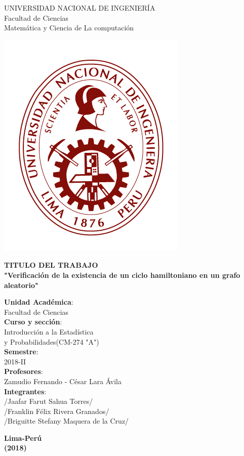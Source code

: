 \documentclass[11pt,a4paper]{article}
\begin{document}
	\begin{center}
	\LARGE \noindent UNIVERSIDAD NACIONAL DE INGENIERÍA\\
	Facultad de Ciencias\\
	Matemática y Ciencia de La computaci{\'o}n
	\end{center}

	\begin{center}
	\begin{minipage}[c]{10cm}
	\includegraphics[scale=1.05]{uni.PNG}
	\end{minipage}
	\end{center}
	\begin{center}
	\LARGE \textbf{TITULO DEL TRABAJO}\\
	{\bf "Verificaci{\'o}n de la existencia de un ciclo hamiltoniano en un grafo aleatorio"}
	\end{center}
	\begin{center}
	\Large \textbf{Unidad Acad{\'e}mica}: 
	\\Facultad de Ciencias\\
	\textbf{Curso y secci{\'o}n}: 
	\\Introducci{\'o}n a la Estad{\'i}stica\\ y Probabilidades(CM-274 "A")\\
	\textbf{Semestre}: 
	\\2018-II\\
	\textbf{Profesores}:
	\\ Zamudio Fernando - C{\'e}sar Lara Ávila\\
	\textbf{Integrantes}:\\
	/Jaafar Farut Sahua Torres/\\
	/Franklin F{\'e}lix Rivera Granados/\\
	/Briguitte Stefany Maquera de la Cruz/\\
\end{center}
\begin{center}
\LARGE \vfill\textbf{Lima-Per{\'u}}\\
\textbf{(2018)}
\end{center}
\end{document}
